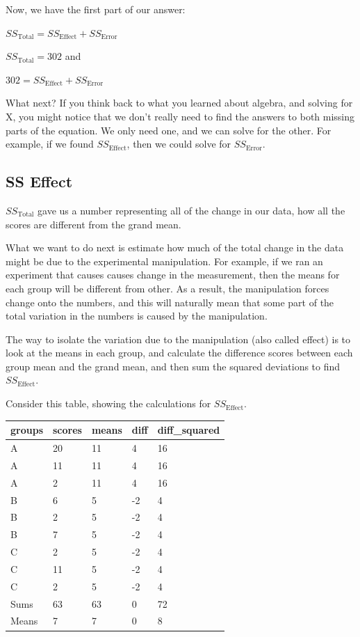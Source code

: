 \documentclass[
]{book}
\begin{document}
Now, we have the first part of our answer:

\(SS_\text{Total} = SS_\text{Effect} + SS_\text{Error}\)

\(SS_\text{Total} = 302\) and

\(302 = SS_\text{Effect} + SS_\text{Error}\)

What next? If you think back to what you learned about algebra, and solving for X, you might notice that we don't really need to find the answers to both missing parts of the equation. We only need one, and we can solve for the other. For example, if we found \(SS_\text{Effect}\), then we could solve for \(SS_\text{Error}\).

\subsection{SS Effect}\label{ss-effect}

\(SS_\text{Total}\) gave us a number representing all of the change in our data, how all the scores are different from the grand mean.

What we want to do next is estimate how much of the total change in the data might be due to the experimental manipulation. For example, if we ran an experiment that causes causes change in the measurement, then the means for each group will be different from other. As a result, the manipulation forces change onto the numbers, and this will naturally mean that some part of the total variation in the numbers is caused by the manipulation.

The way to isolate the variation due to the manipulation (also called effect) is to look at the means in each group, and calculate the difference scores between each group mean and the grand mean, and then sum the squared deviations to find \(SS_\text{Effect}\).

Consider this table, showing the calculations for \(SS_\text{Effect}\).

\begin{tabular}{l|l|l|l|l}
\hline
groups & scores & means & diff & diff\_squared\\
\hline
A & 20 & 11 & 4 & 16\\
\hline
A & 11 & 11 & 4 & 16\\
\hline
A & 2 & 11 & 4 & 16\\
\hline
B & 6 & 5 & -2 & 4\\
\hline
B & 2 & 5 & -2 & 4\\
\hline
B & 7 & 5 & -2 & 4\\
\hline
C & 2 & 5 & -2 & 4\\
\hline
C & 11 & 5 & -2 & 4\\
\hline
C & 2 & 5 & -2 & 4\\
\hline
Sums & 63 & 63 & 0 & 72\\
\hline
Means & 7 & 7 & 0 & 8\\
\hline
\end{tabular}
\end{document}
